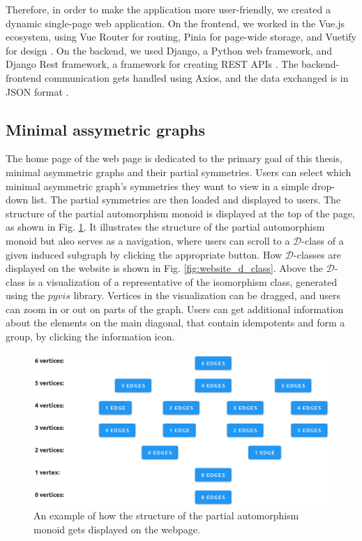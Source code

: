 Therefore, in order to make the application more user-friendly, we created a dynamic single-page web application. On the frontend, we worked in the Vue.js ecosystem, using Vue Router for routing, Pinia for page-wide storage, and Vuetify for design \cite{vue, pinia, vuetify}. On the backend, we used Django, a Python web framework, and Django Rest framework, a framework for creating REST APIs \cite{django, drf}. The backend-frontend communication gets handled using Axios, and the data exchanged is in JSON format \cite{axios}.

\subsection{Minimal assymetric graphs}

The home page of the web page is dedicated to the primary goal of this thesis, minimal asymmetric graphs and their partial symmetries. Users can select which minimal asymmetric graph's symmetries they want to view in a simple drop-down list. The partial symmetries are then loaded and displayed to users. The structure of the partial automorphism monoid is displayed at the top of the page, as shown in Fig. \ref{fig:website_monoid_structure}. It illustrates the structure of the partial automorphism monoid but also serves as a navigation, where users can scroll to a $\mathcal{D}$-class of a given induced subgraph by clicking the appropriate button. How $\mathcal{D}$-classes are displayed on the website is shown in Fig. \ref{fig:website_d_class}. Above the $\mathcal{D}$-class is a visualization of a representative of the isomorphism class, generated using the $pyvis$ library. Vertices in the visualization can be dragged, and users can zoom in or out on parts of the graph. Users can get additional information about the elements on the main diagonal, that contain idempotents and form a group, by clicking the information icon.

\begin{figure}[H]
\begin{center}
\includegraphics[width=\textwidth,keepaspectratio]{images/website_monoid_structure.png}
\end{center}
\caption{An example of how the structure of the partial automorphism monoid gets displayed on the webpage.}
\label{fig:website_monoid_structure}
\end{figure}

